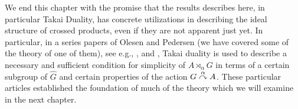 We end this chapter with the promise that the results describes here, in particular Takai Duality, has concrete utilizations in describing the ideal structure of crossed products, even if they are not apparent just yet. In particular, in a series papers of Olesen and Pedersen (we have covered some of the theory of one of them), see e.g., \cite{olesenpedersen1}, \cite{olesenpedersen2} and \cite{olesenpedersen3}, Takai duality is used to describe a necessary and sufficient condition for simplicity of $A \rtimes_\alpha G$ in terms of a certain subgroup of $\hat G$ and certain properties of the action $G \stackrel{\alpha}{\curvearrowright} A$. These particular articles established the foundation of much of the theory which we will examine in the next chapter.
